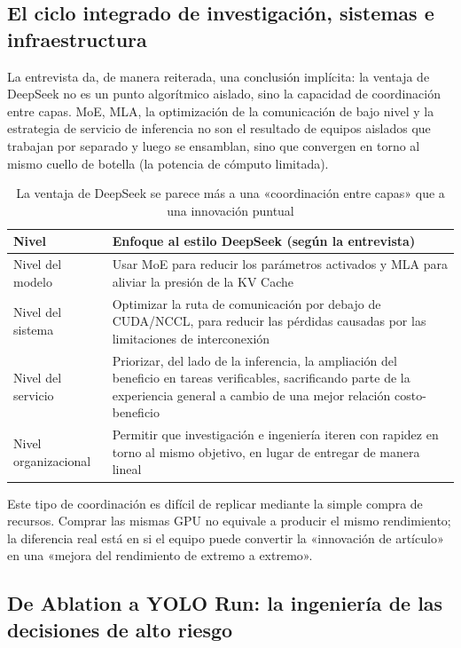 \documentclass[a4paper]{article}
\begin{document}
\subsection{El ciclo integrado de investigación, sistemas e infraestructura}

La entrevista da, de manera reiterada, una conclusión implícita: la ventaja de DeepSeek no es un punto algorítmico aislado, sino la capacidad de coordinación entre capas. MoE, MLA, la optimización de la comunicación de bajo nivel y la estrategia de servicio de inferencia no son el resultado de equipos aislados que trabajan por separado y luego se ensamblan, sino que convergen en torno al mismo cuello de botella (la potencia de cómputo limitada).

\begin{table}[H]
\centering
\begin{tabular}{lp{8.5cm}}
\toprule
\textbf{Nivel} & \textbf{Enfoque al estilo DeepSeek (según la entrevista)} \\
\midrule
Nivel del modelo & Usar MoE para reducir los parámetros activados y MLA para aliviar la presión de la KV Cache \\
Nivel del sistema & Optimizar la ruta de comunicación por debajo de CUDA/NCCL, para reducir las pérdidas causadas por las limitaciones de interconexión \\
Nivel del servicio & Priorizar, del lado de la inferencia, la ampliación del beneficio en tareas verificables, sacrificando parte de la experiencia general a cambio de una mejor relación costo-beneficio \\
Nivel organizacional & Permitir que investigación e ingeniería iteren con rapidez en torno al mismo objetivo, en lugar de entregar de manera lineal \\
\bottomrule
\end{tabular}
\caption{La ventaja de DeepSeek se parece más a una «coordinación entre capas» que a una innovación puntual}
\end{table}

Este tipo de coordinación es difícil de replicar mediante la simple compra de recursos. Comprar las mismas GPU no equivale a producir el mismo rendimiento; la diferencia real está en si el equipo puede convertir la «innovación de artículo» en una «mejora del rendimiento de extremo a extremo».

\subsection{De Ablation a YOLO Run: la ingeniería de las decisiones de alto riesgo}
\end{document}

